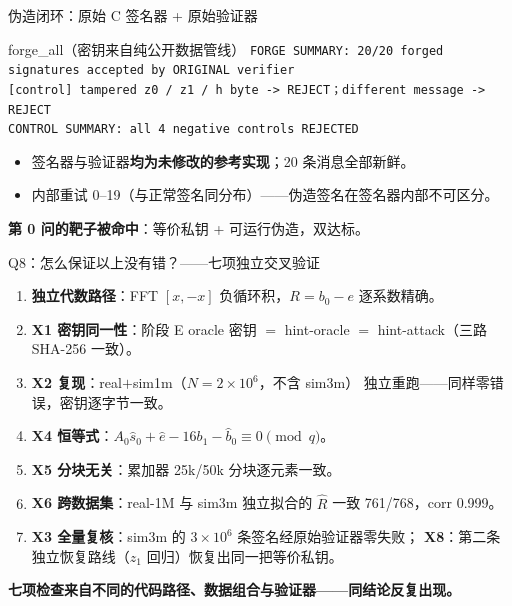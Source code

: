 \documentclass[11pt,aspectratio=169]{ctexbeamer}
\begin{document}
\begin{frame}{伪造闭环：原始 C 签名器 + 原始验证器}
  \begin{exampleblock}{forge\_all（密钥来自纯公开数据管线）}
    \small
    \texttt{FORGE SUMMARY: 20/20 forged signatures accepted by ORIGINAL verifier}\\
    \texttt{[control] tampered z0 / z1 / h byte -> REJECT；different message -> REJECT}\\
    \texttt{CONTROL SUMMARY: all 4 negative controls REJECTED}
  \end{exampleblock}
  \begin{itemize}
    \item 签名器与验证器\textbf{均为未修改的参考实现}；20 条消息全部新鲜。
    \item 内部重试 0--19（与正常签名同分布）——伪造签名在签名器内部不可区分。
  \end{itemize}
  \begin{center}
    \small \textbf{第 0 问的靶子被命中}：等价私钥 + 可运行伪造，双达标。
  \end{center}
\end{frame}

\begin{frame}{Q8：怎么保证以上没有错？——七项独立交叉验证}
  \small
  \begin{enumerate}
    \item \textbf{独立代数路径}：FFT $[x,-x]$ 负循环积，$R=b_0-e$ 逐系数精确。
    \item \textbf{X1 密钥同一性}：阶段 E oracle 密钥 $=$ hint-oracle $=$
          hint-attack（三路 SHA-256 一致）。
    \item \textbf{X2 复现}：real$+$sim1m（$N=2\times10^6$，不含 sim3m）
          独立重跑——同样零错误，密钥逐字节一致。
    \item \textbf{X4 恒等式}：$A_0\hat s_0+\hat e-16b_1-\hat b_0\equiv0\pmod q$。
    \item \textbf{X5 分块无关}：累加器 25k/50k 分块逐元素一致。
    \item \textbf{X6 跨数据集}：real-1M 与 sim3m 独立拟合的 $\hat R$
          一致 761/768，corr 0.999。
    \item \textbf{X3 全量复核}：sim3m 的 $3\times10^6$ 条签名经原始验证器零失败；
          \textbf{X8}：第二条独立恢复路线（$z_1$ 回归）恢复出同一把等价私钥。
  \end{enumerate}
  \begin{center}
    \small \textbf{七项检查来自不同的代码路径、数据组合与验证器——同结论反复出现。}
  \end{center}
\end{frame}
\end{document}
